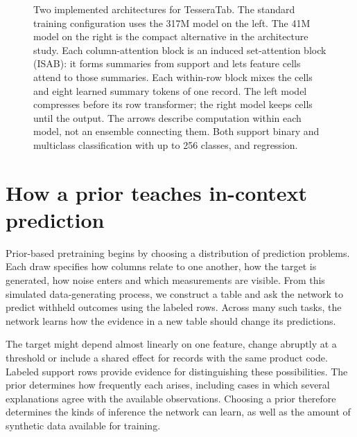 \documentclass[11pt]{article}
\begin{document}
\begin{figure}[p]
\caption{Two implemented architectures for TesseraTab. The standard training configuration uses the 317M model on the left. The 41M model on the right is the compact alternative in the architecture study. Each column-attention block is an induced set-attention block (ISAB): it forms summaries from support and lets feature cells attend to those summaries. Each within-row block mixes the cells and eight learned summary tokens of one record. The left model compresses before its row transformer; the right model keeps cells until the output. The arrows describe computation within each model, not an ensemble connecting them. Both support binary and multiclass classification with up to 256 classes, and regression.}
\label{fig:architecture-choice}
\end{figure}

\clearpage

\section{How a prior teaches in-context prediction}
\label{sec:prior-philosophy}

Prior-based pretraining begins by choosing a distribution of prediction problems. Each draw specifies how columns relate to one another, how the target is generated, how noise enters and which measurements are visible. From this simulated data-generating process, we construct a table and ask the network to predict withheld outcomes using the labeled rows. Across many such tasks, the network learns how the evidence in a new table should change its predictions.

The target might depend almost linearly on one feature, change abruptly at a threshold or include a shared effect for records with the same product code. Labeled support rows provide evidence for distinguishing these possibilities. The prior determines how frequently each arises, including cases in which several explanations agree with the available observations. Choosing a prior therefore determines the kinds of inference the network can learn, as well as the amount of synthetic data available for training.
\end{document}
